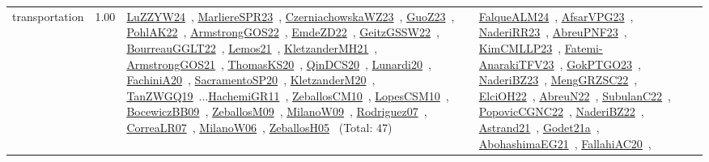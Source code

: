 {\begin{longtable}{p{3cm}r>{\raggedright\arraybackslash}p{6cm}>{\raggedright\arraybackslash}p{6cm}>{\raggedright\arraybackslash}p{8cm}}
\index{transportation}\index{Concepts!transportation}transportation &  1.00 & \href{../works/LuZZYW24.pdf}{LuZZYW24}~\cite{LuZZYW24}, \href{../works/MarliereSPR23.pdf}{MarliereSPR23}~\cite{MarliereSPR23}, \href{../works/CzerniachowskaWZ23.pdf}{CzerniachowskaWZ23}~\cite{CzerniachowskaWZ23}, \href{../works/GuoZ23.pdf}{GuoZ23}~\cite{GuoZ23}, \href{../works/PohlAK22.pdf}{PohlAK22}~\cite{PohlAK22}, \href{../works/ArmstrongGOS22.pdf}{ArmstrongGOS22}~\cite{ArmstrongGOS22}, \href{../works/EmdeZD22.pdf}{EmdeZD22}~\cite{EmdeZD22}, \href{../works/GeitzGSSW22.pdf}{GeitzGSSW22}~\cite{GeitzGSSW22}, \href{../works/BourreauGGLT22.pdf}{BourreauGGLT22}~\cite{BourreauGGLT22}, \href{../works/Lemos21.pdf}{Lemos21}~\cite{Lemos21}, \href{../works/KletzanderMH21.pdf}{KletzanderMH21}~\cite{KletzanderMH21}, \href{../works/ArmstrongGOS21.pdf}{ArmstrongGOS21}~\cite{ArmstrongGOS21}, \href{../works/ThomasKS20.pdf}{ThomasKS20}~\cite{ThomasKS20}, \href{../works/QinDCS20.pdf}{QinDCS20}~\cite{QinDCS20}, \href{../works/Lunardi20.pdf}{Lunardi20}~\cite{Lunardi20}, \href{../works/FachiniA20.pdf}{FachiniA20}~\cite{FachiniA20}, \href{../works/SacramentoSP20.pdf}{SacramentoSP20}~\cite{SacramentoSP20}, \href{../works/KletzanderM20.pdf}{KletzanderM20}~\cite{KletzanderM20}, \href{../works/TanZWGQ19.pdf}{TanZWGQ19}~\cite{TanZWGQ19}...\href{../works/HachemiGR11.pdf}{HachemiGR11}~\cite{HachemiGR11}, \href{../works/ZeballosCM10.pdf}{ZeballosCM10}~\cite{ZeballosCM10}, \href{../works/LopesCSM10.pdf}{LopesCSM10}~\cite{LopesCSM10}, \href{../works/BocewiczBB09.pdf}{BocewiczBB09}~\cite{BocewiczBB09}, \href{../works/ZeballosM09.pdf}{ZeballosM09}~\cite{ZeballosM09}, \href{../works/MilanoW09.pdf}{MilanoW09}~\cite{MilanoW09}, \href{../works/Rodriguez07.pdf}{Rodriguez07}~\cite{Rodriguez07}, \href{../works/CorreaLR07.pdf}{CorreaLR07}~\cite{CorreaLR07}, \href{../works/MilanoW06.pdf}{MilanoW06}~\cite{MilanoW06}, \href{../works/ZeballosH05.pdf}{ZeballosH05}~\cite{ZeballosH05} (Total: 47) & \href{../works/FalqueALM24.pdf}{FalqueALM24}~\cite{FalqueALM24}, \href{../works/AfsarVPG23.pdf}{AfsarVPG23}~\cite{AfsarVPG23}, \href{../works/NaderiRR23.pdf}{NaderiRR23}~\cite{NaderiRR23}, \href{../works/AbreuPNF23.pdf}{AbreuPNF23}~\cite{AbreuPNF23}, \href{../works/KimCMLLP23.pdf}{KimCMLLP23}~\cite{KimCMLLP23}, \href{../works/Fatemi-AnarakiTFV23.pdf}{Fatemi-AnarakiTFV23}~\cite{Fatemi-AnarakiTFV23}, \href{../works/GokPTGO23.pdf}{GokPTGO23}~\cite{GokPTGO23}, \href{../works/NaderiBZ23.pdf}{NaderiBZ23}~\cite{NaderiBZ23}, \href{../works/MengGRZSC22.pdf}{MengGRZSC22}~\cite{MengGRZSC22}, \href{../works/ElciOH22.pdf}{ElciOH22}~\cite{ElciOH22}, \href{../works/AbreuN22.pdf}{AbreuN22}~\cite{AbreuN22}, \href{../works/SubulanC22.pdf}{SubulanC22}~\cite{SubulanC22}, \href{../works/PopovicCGNC22.pdf}{PopovicCGNC22}~\cite{PopovicCGNC22}, \href{../works/NaderiBZ22.pdf}{NaderiBZ22}~\cite{NaderiBZ22}, \href{../works/Astrand21.pdf}{Astrand21}~\cite{Astrand21}, \href{../works/Godet21a.pdf}{Godet21a}~\cite{Godet21a}, \href{../works/AbohashimaEG21.pdf}{AbohashimaEG21}~\cite{AbohashimaEG21}, \href{../works/FallahiAC20.pdf}{FallahiAC20}~\cite{FallahiAC20}, 
\end{longtable}}
